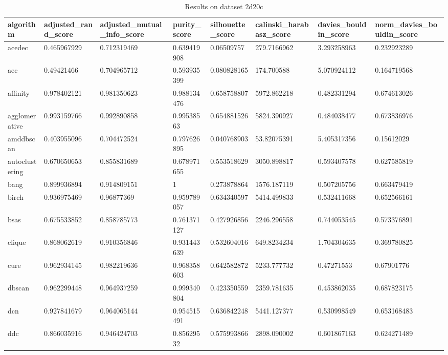 \clearpage

\begin{table}[H]
\centering
\caption{Results on dataset 2d20c}
\label{S51_Table}
\begin{tabular}{|l|l|l|l|l|l|l|l|}
\hline
algorithm & adjusted\_rand\_score & adjusted\_mutual\_info\_score & purity\_score & silhouette\_score & calinski\_harabasz\_score & davies\_bouldin\_score & norm\_davies\_bouldin\_score \\
\hline
acedec & 0.465967929 & 0.712319469 & 0.639419908 & 0.06509757 & 279.7166962 & 3.293258963 & 0.232923289 \\
\hline
aec & 0.49421466 & 0.704965712 & 0.593935399 & 0.080828165 & 174.700588 & 5.070924112 & 0.164719568 \\
\hline
affinity & 0.978402121 & 0.981350623 & 0.988134476 & 0.658758807 & 5972.862218 & 0.482331294 & 0.674613026 \\
\hline
agglomerative & 0.993159766 & 0.992890858 & 0.99538563 & 0.654881526 & 5824.390927 & 0.484038477 & 0.673836976 \\
\hline
amddbscan & 0.403955096 & 0.704472524 & 0.797626895 & 0.040768903 & 53.82075391 & 5.405317356 & 0.15612029 \\
\hline
autoclustering & 0.670650653 & 0.855831689 & 0.678971655 & 0.553518629 & 3050.898817 & 0.593407578 & 0.627585819 \\
\hline
bang & 0.899936894 & 0.914809151 & 1 & 0.273878864 & 1576.187119 & 0.507205756 & 0.663479419 \\
\hline
birch & 0.936975469 & 0.96877369 & 0.959789057 & 0.634340597 & 5414.499833 & 0.532411668 & 0.652566161 \\
\hline
bsas & 0.675533852 & 0.858785773 & 0.761371127 & 0.427926856 & 2246.296558 & 0.744053545 & 0.573376891 \\
\hline
clique & 0.868062619 & 0.910356846 & 0.931443639 & 0.532604016 & 649.8234234 & 1.704304635 & 0.369780825 \\
\hline
cure & 0.962934145 & 0.982219636 & 0.968358603 & 0.642582872 & 5233.777732 & 0.47271553 & 0.67901776 \\
\hline
dbscan & 0.962299448 & 0.964937259 & 0.999340804 & 0.423350559 & 2359.781635 & 0.453862035 & 0.687823175 \\
\hline
dcn & 0.927841679 & 0.964065144 & 0.954515491 & 0.636842248 & 5441.127377 & 0.530998549 & 0.653168483 \\
\hline
ddc & 0.866035916 & 0.946424703 & 0.85629532 & 0.575993866 & 2898.090002 & 0.601867163 & 0.624271489 \\

\end{tabular}
\end{table}
